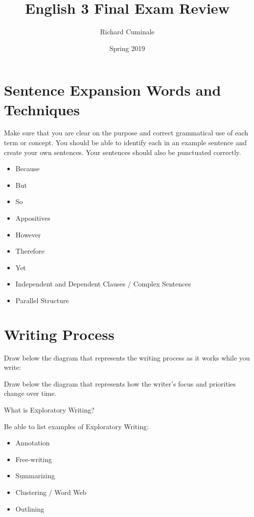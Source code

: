 \documentclass[11pt]{article}
\author{Richard Cuminale}
\date{Spring 2019}
\title{English 3 Final Exam Review}
\begin{document}
\maketitle

\section{Sentence Expansion Words and Techniques}
\label{sec:orgeb1a0b8}

Make sure that you are clear on the purpose and correct grammatical
use of each term or concept. You should be able to identify each in an
example sentence and create your own sentences. Your sentences should
also be punctuated correctly.
\begin{itemize}
\item Because
\item But
\item So
\item Appositives
\item However
\item Therefore
\item Yet
\item Independent and Dependent Clauses / Complex Sentences
\item Parallel Structure
\end{itemize}

\section{Writing Process}
\label{sec:org8a001c2}

Draw below the diagram that represents the writing process as it works
while you write:
\vspace{6cm}

\newpage
Draw below the diagram that represents how the writer's focus and
priorities change over time.
\vspace{6cm}

What is Exploratory Writing?
\vspace{2cm}

Be able to list examples of Exploratory Writing:
\begin{itemize}
\item Annotation
\item Free-writing
\item Summarizing
\item Clustering / Word Web
\item Outlining
\end{itemize}
\vspace{1cm}
\end{document}
